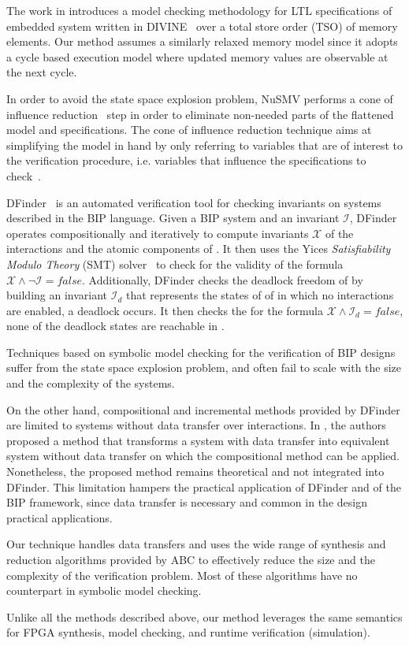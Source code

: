 The work in \cite{BarnatVMCAI2013} introduces a model checking
methodology for LTL specifications of embedded system written 
in DIVINE~\cite{Divine}  over
a total store order (TSO) of memory elements. 
Our method assumes a similarly relaxed memory model
since it adopts a cycle based execution model where 
updated memory values are observable at the next cycle. 

In order to avoid the state space explosion problem, NuSMV performs a cone of 
influence reduction~\cite{berezin1998compositional} step in order to eliminate
non-needed parts of the flattened model and specifications. The cone of influence
reduction technique aims at simplifying the model in hand by only 
referring to variables that are of interest to the verification procedure, i.e. variables
that influence the specifications to check~\cite{clarke1999model}.

DFinder~\cite{dfinder} is an automated verification tool for checking invariants
on systems described in the BIP language. Given a BIP system \Pm and 
an invariant $\mathcal{I}$, DFinder operates  compositionally and iteratively
to compute invariants $\mathcal{X}$ of the interactions and the atomic 
components of \Pm. It then uses the Yices {\em Satisfiability Modulo
Theory} (SMT) solver~\cite{dutertre2006fast} to check for the validity 
of the formula $\mathcal{X} \land \lnot \mathcal{I} = false$. 
Additionally, DFinder checks the deadlock freedom of  \Pm by building an invariant 
$\mathcal{I}_d$ that represents the states of of \Pm in which no interactions 
are enabled, \ie{} a deadlock occurs. It then checks the for the formula
$\mathcal{X} \land \mathcal{I}_d = false$, \ie{} none of the deadlock states
are reachable in \Pm.   

Techniques based on symbolic model checking for the verification of 
BIP designs suffer from the state space explosion problem, and often 
fail to scale with the size and the complexity of the systems. 



On the other hand, compositional and incremental methods provided by DFinder are limited to systems without data
transfer over interactions. In \cite{hungthesis10}, the authors proposed a method that transforms a system with data transfer into equivalent system without data transfer on which the compositional method can be applied. Nonetheless, the proposed method remains theoretical and not integrated into DFinder. This limitation hampers the practical application of DFinder and of the BIP framework, since data transfer is necessary and common in the design practical applications.


Our technique handles data transfers and uses the wide range of synthesis 
and reduction algorithms provided by ABC to effectively reduce the size and 
the complexity of the verification problem. Most of these algorithms have no counterpart
in symbolic model checking.  

Unlike all the methods described above, our method leverages
the same semantics for FPGA synthesis, model checking, 
and runtime verification (simulation). 
